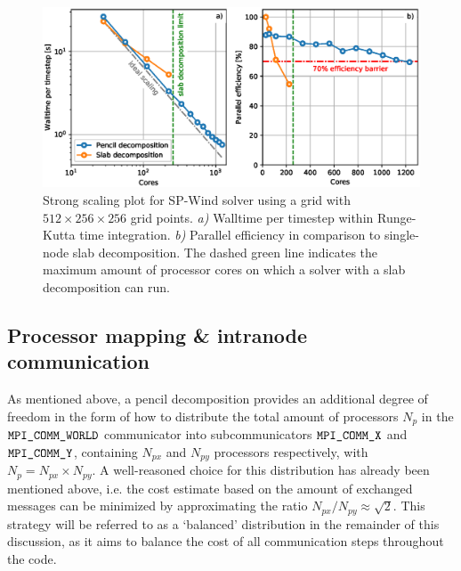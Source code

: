 \begin{figure}
	\includegraphics[width=\textwidth]{figures/meth_strong_scaling.eps}
	\caption[Strong scaling plot for SP-Wind solver using a grid with $512 \times 256 \times 256$ grid points.]{Strong scaling plot for SP-Wind solver using a grid with $512 \times 256 \times 256$ grid points. \emph{a)} Walltime per timestep within Runge-Kutta time integration. \emph{b)} Parallel efficiency in comparison to single-node slab decomposition. The dashed green line indicates the maximum amount of processor cores on which a solver with a slab decomposition can run.\label{fig:strongscaling}}
\end{figure}

\subsection{Processor mapping \& intranode communication}\label{sec:meth_par_map}

As mentioned above, a pencil decomposition provides an additional degree of freedom in the form of how to distribute the total amount of processors $N_p$ in the $\verb|MPI_COMM_WORLD|$ communicator into subcommunicators $\verb|MPI_COMM_X|$ and $\verb|MPI_COMM_Y|$, containing $N_{px}$ and $N_{py}$ processors respectively, with $N_p = N_{px} \times N_{py}$. A well-reasoned choice for this distribution has already been mentioned above, i.e. the cost estimate based on the amount of exchanged messages can be minimized by approximating the ratio $N_{px}/N_{py} \approx \sqrt{2}$. This strategy will be referred to as a `balanced' distribution in the remainder of this discussion, as it aims to balance the cost of all communication steps throughout the code. 

